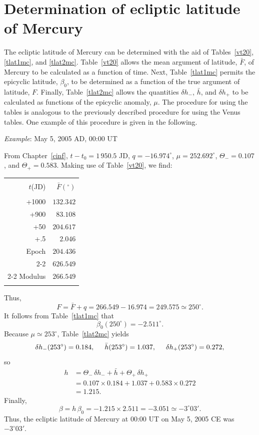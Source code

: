 \section{Determination of ecliptic latitude of Mercury}
The ecliptic latitude of Mercury can be determined with the aid of Tables~\ref{vt20}, \ref{tlat1mc}, and \ref{tlat2mc}. Table~\ref{vt20} allows
the mean argument of latitude, $\bar{F}$, of Mercury to be calculated as a function of
time. Next, Table~\ref{tlat1mc} permits the epicyclic  latitude, $\beta_0$, to
be determined as a function of the true argument of latitude, $F$. Finally, Table~\ref{tlat2mc} allows the quantities
$\delta h_-$, $\bar{h}$, and $\delta h_+$ to be calculated as functions of the epicyclic
anomaly, $\mu$. 
The procedure for using the tables is analogous to the previously
described procedure for using the Venus tables.
One example of this procedure is given in the following.

\begin{center}
 {\em Example}: May 5, 2005 AD, 00:00 UT
\end{center}
From Chapter~\ref{cinf}, $t-t_0=1\,950.5$ JD, 
$q= -16.974^\circ$,  $\mu= 252.692^\circ$, $\Theta_-=0.107$, and
$\Theta_+ = 0.583$.
 Making use of
Table~\ref{vt20}, we find:
\begin{center}
\begin{tabular}{rr}
&\\
$t$(JD) & $\bar{F}(^\circ)$\\[-2ex]
&\\
+1000 & $132.342$ \\
+900 & $83.108$\\
+50 & $204.617$ \\
+.5 & $2.046$\\
Epoch & $204.436$ \\\cline{2-2}
&$626.549$ \\\cline{2-2}
Modulus & $266.549$ \\ 
&\\
\end{tabular}
\end{center}
Thus,
$$
F = \bar{F} + q = 266.549-16.974= 249.575\simeq 250^\circ.
$$
It follows from Table~\ref{tlat1mc} that
$$
\beta_0(250^\circ) = -2.511^\circ.
$$
Because $\mu\simeq 253^\circ$, Table~\ref{tlat2mc} yields
$$
\delta h_-(253^\circ) = 0.184,\mbox{\hspace{0.5cm}}\bar{h}(253^\circ)
=1.037, \mbox{\hspace{0.5cm}}\delta h_+(253^\circ) 
= 0.272,
$$
so
\begin{align*}
h &= \Theta_-\,\delta h_- + \bar{h}+\Theta_+\,\delta h_+ \\[0.5ex]
&= 0.107\times 0.184+1.037+0.583\times 0.272\\[0.5ex]
&= 1.215.
\end{align*}
Finally,
$$
\beta = h\,\beta_0 =- 1.215\times 2.511 = -3.051\simeq -3^\circ 03'.
$$
Thus,
the ecliptic latitude of Mercury at 00:00 UT on May 5, 2005 CE was $-3^\circ 03'$.


